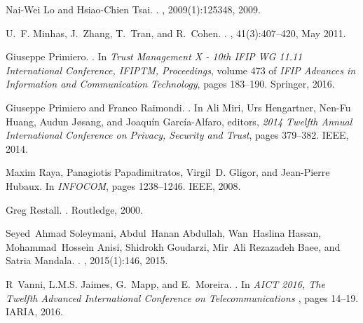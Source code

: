 \documentclass{beamer}
\begin{document}
\begin{frame}[allowframebreaks]
\begin{thebibliography}{10}
Nai-Wei Lo and Hsiao-Chien Tsai.
.
,
  2009(1):125348, 2009.

U.~F. Minhas, J.~Zhang, T.~Tran, and R.~Cohen.
.
, 41(3):407--420, May 2011.

Giuseppe Primiero.
.
\newblock In {\em {Trust Management {X} - 10th {IFIP} {WG}
  11.11 International Conference, {IFIPTM}, Proceedings}}, volume 473 of {\em {{IFIP} Advances in
  Information and Communication Technology}}, pages 183--190. Springer, 2016.

Giuseppe Primiero and Franco Raimondi.
.
\newblock In Ali Miri, Urs Hengartner, Nen{-}Fu Huang, Audun J{\o}sang, and
  Joaqu{\'i}n Garc{\'i}a{-}Alfaro, editors, {\em {2014 Twelfth Annual
  International Conference on Privacy, Security and Trust}}, pages 379--382. {IEEE}, 2014.

Maxim Raya, Panagiotis Papadimitratos, Virgil~D. Gligor, and Jean-Pierre
  Hubaux.
\newblock In {\em {INFOCOM}}, pages 1238--1246. IEEE, 2008.

Greg Restall.
.
\newblock Routledge, 2000.

Seyed~Ahmad Soleymani, Abdul~Hanan Abdullah, Wan~Haslina Hassan,
  Mohammad~Hossein Anisi, Shidrokh Goudarzi, Mir~Ali {Rezazadeh Baee}, and
  Satria Mandala.
.
,
  2015(1):146, 2015.

R~Vanni, L.M.S. Jaimes, G.~Mapp, and E.~Moreira.
.
\newblock In {\em {AICT 2016, The Twelfth Advanced International Conference on
  Telecommunications }}, pages 14--19. IARIA, 2016.


\end{thebibliography}
\end{frame}
\end{document}
